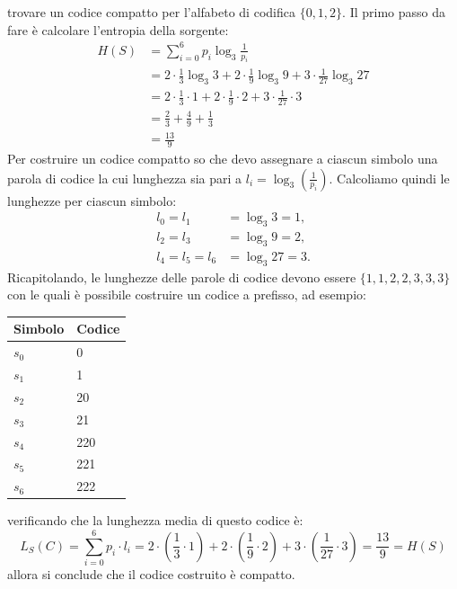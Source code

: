 \documentclass{article}
\theoremstyle{definition}
\numberwithin{equation}{section}
\begin{document}
trovare un codice compatto per l'alfabeto di codifica $\{0,1,2\}$.
Il primo passo da fare è calcolare l'entropia della sorgente:
\begin{align*}
    H(S)
     & = \sum_{i=0}^6 p_i \log_3 \frac{1}{p_i}   \\
     & = 2 \cdot \frac{1}{3}\log_3 3
    + 2 \cdot \frac{1}{9}\log_3 9
    + 3 \cdot \frac{1}{27}\log_3 27              \\
     & = 2 \cdot \frac{1}{3}\cdot 1
    + 2 \cdot \frac{1}{9}\cdot 2
    + 3 \cdot \frac{1}{27}\cdot 3                \\
     & = \frac{2}{3} + \frac{4}{9} + \frac{1}{3} \\
     & = \frac{13}{9}
\end{align*}
Per costruire un codice compatto so che devo assegnare a ciascun simbolo una parola di codice la cui lunghezza sia pari a $l_i = \log_3\!\left(\frac{1}{p_i}\right)$. Calcoliamo quindi le lunghezze per ciascun simbolo:
\begin{align*}
    l_0 = l_1       & = \log_3 3 = 1,  \\
    l_2 = l_3       & = \log_3 9 = 2,  \\
    l_4 = l_5 = l_6 & = \log_3 27 = 3.
\end{align*}
Ricapitolando, le lunghezze delle parole di codice devono essere $\{1,1,2,2,3,3,3\}$ con le quali è possibile costruire un codice a prefisso, ad esempio:
\begin{table}[htpb]
    \centering
    \begin{tabular}{|l|l|}
        \hline
        \textbf{Simbolo} & \textbf{Codice} \\ \hline
        $s_0$            & 0               \\ \hline
        $s_1$            & 1               \\ \hline
        $s_2$            & 20              \\ \hline
        $s_3$            & 21              \\ \hline
        $s_4$            & 220             \\ \hline
        $s_5$            & 221             \\ \hline
        $s_6$            & 222             \\ \hline
    \end{tabular}
\end{table}

verificando che la lunghezza media di questo codice è:
\[
    L_S(C) = \sum_{i=0}^6 p_i \cdot l_i
    = 2 \cdot \left(\frac{1}{3}\cdot 1\right)
    + 2 \cdot \left(\frac{1}{9}\cdot 2\right)
    + 3 \cdot \left(\frac{1}{27}\cdot 3\right)
    = \frac{13}{9} = H(S)
\]
allora si conclude che il codice costruito è compatto.
\end{document}
